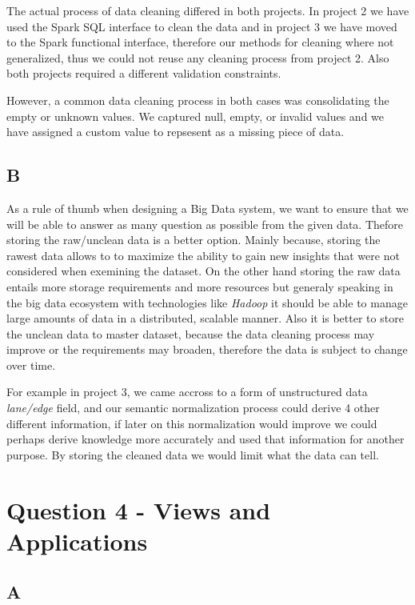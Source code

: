 \documentclass[format=acmsmall, review=false, screen=true]{acmart}
\begin{document}
The actual process of data cleaning differed in both projects. In project 2 we have used the Spark SQL interface to clean the data and in project 3 we have moved to the Spark functional interface, therefore our methods for cleaning where not generalized, thus we could not reuse any cleaning process from project 2. Also both projects required a different validation constraints.

However, a common data cleaning process in both cases was consolidating the empty or unknown values. We captured null, empty, or invalid values and we have assigned a custom value to repsesent as a missing piece of data.


\subsection{B}
As a rule of thumb when designing a Big Data system, we want to ensure that we will be able to answer as many question as possible from the given data. Thefore storing the raw/unclean data is a better option. Mainly because, storing the rawest data allows to to maximize the ability to gain new insights that were not considered when exemining the dataset. On the other hand storing the raw data entails more storage requirements and more resources but generaly speaking in the big data ecosystem with technologies like \textit{Hadoop} it should be able to manage large amounts of data in a distributed, scalable manner. Also it is better to store the unclean data to master dataset, because the data cleaning process may improve or the requirements may broaden, therefore the data is subject to change over time.

For example in project 3, we came accross to a form of unstructured data \textit{lane/edge} field, and our semantic normalization process could derive 4 other different information, if later on this normalization would improve we could perhaps derive knowledge more accurately and used that information for another purpose. By storing the cleaned data we would limit what the data can tell. 

\section{Question 4 - Views and Applications }

\subsection{A}
\end{document}
